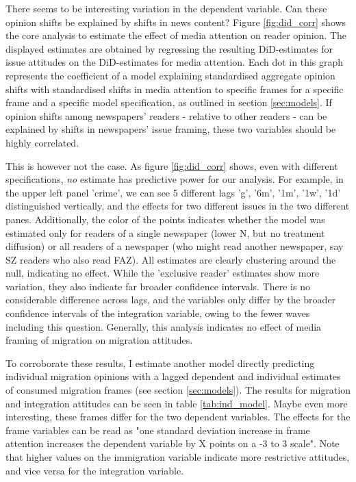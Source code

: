 \documentclass{article}
\begin{document}
There seems to be interesting variation in the dependent variable. Can these opinion shifts be explained by shifts in news content? Figure \ref{fig:did_corr} shows the core analysis to estimate the effect of media attention on reader opinion. The displayed estimates are obtained by regressing the resulting DiD-estimates for issue attitudes on the DiD-estimates for media attention. Each dot in this graph represents the coefficient of a model explaining standardised aggregate opinion shifts with standardised shifts in media attention to specific frames for a specific frame and a specific model specification, as outlined in section \ref{sec:models}. If opinion shifts among newspapers' readers - relative to other readers - can be explained by shifts in newspapers' issue framing, these two variables should be highly correlated.

This is however not the case. As figure \ref{fig:did_corr} shows, even with different specifications, \textit{no} estimate has predictive power for our analysis. For example, in the upper left panel 'crime', we can see 5 different lags 'g', '6m', '1m', '1w', '1d' distinguished vertically, and the effects for two different issues in the two different panes. Additionally, the color of the points indicates whether the model was estimated only for readers of a single newspaper (lower N, but no treatment diffusion) or all readers of a newspaper (who might read another newspaper, say SZ readers who also read FAZ). All estimates are clearly clustering around the null, indicating no effect. While the 'exclusive reader' estimates show more variation, they also indicate far broader confidence intervals. There is no considerable difference across lags, and the variables only differ by the broader confidence intervals of the integration variable, owing to the fewer waves including this question. Generally, this analysis indicates no effect of media framing of migration on migration attitudes.

To corroborate these results, I estimate another model directly predicting individual migration opinions with a lagged dependent and individual estimates of consumed migration frames (see section \ref{sec:models}). The results for migration and integration attitudes can be seen in table \ref{tab:ind_model}. Maybe even more interesting, these frames differ for the two dependent variables. The effects for the frame variables can be read as "one standard deviation increase in frame attention increases the dependent variable by X points on a -3 to 3 scale". Note that higher values on the immigration variable indicate more restrictive attitudes, and vice versa for the integration variable.
\end{document}
